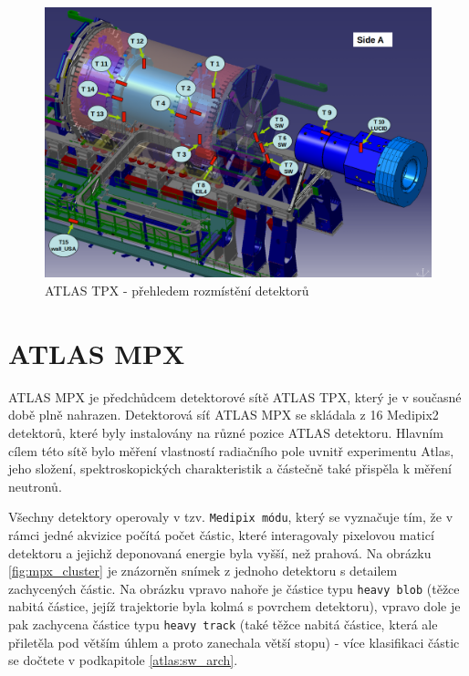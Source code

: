 \begin{figure}[ht]
	\begin{center}
		\includegraphics[width=12cm]{figures/tpx_positions.png}
		\caption{ATLAS TPX - přehledem rozmístění detektorů}
		\label{fig:tpx_positions}
	\end{center}
\end{figure}

\section{ATLAS MPX}\label{atlas:mpx}
ATLAS MPX\cite{Vykydal200935}\cite{atlasmpx} je předchůdcem detektorové sítě ATLAS TPX, který je v současné době plně nahrazen. Detektorová síť ATLAS MPX se skládala z 16 Medipix2 detektorů, které byly instalovány na různé pozice ATLAS detektoru. Hlavním cílem této sítě bylo měření vlastností radiačního pole uvnitř experimentu Atlas, jeho složení, spektroskopických charakteristik a částečně také přispěla k měření neutronů. 


Všechny detektory operovaly v tzv. \texttt{Medipix módu}, který se vyznačuje tím, že v rámci jedné akvizice počítá počet částic, které interagovaly pixelovou maticí detektoru a jejichž deponovaná energie byla vyšší, než prahová. Na obrázku \ref{fig:mpx_cluster} je znázorněn snímek z jednoho detektoru s detailem zachycených částic. Na obrázku vpravo nahoře je částice typu \texttt{heavy blob} (těžce nabitá částice, jejíž trajektorie byla kolmá s povrchem detektoru), vpravo dole je pak zachycena částice typu \texttt{heavy track} (také těžce nabitá částice, která ale přiletěla pod větším úhlem a proto zanechala větší stopu) - více klasifikaci částic se dočtete v podkapitole \ref{atlas:sw_arch}.


